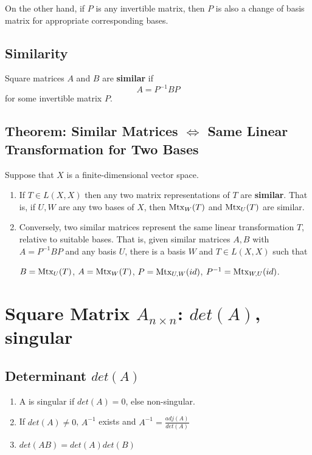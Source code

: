 \documentclass[11pt]{elegantbook}
\begin{document}
On the other hand, if $P$ is any invertible matrix, then $P$ is also a change of basis matrix for appropriate corresponding bases.

\subsection{Similarity}
\begin{definition}[Similar]
    \normalfont
    Square matrices $A$ and $B$ are \textbf{similar} if $$A=P^{-1}BP$$ for some invertible matrix $P$.
\end{definition}


\subsection{Theorem: Similar Matrices $\Leftrightarrow$ Same Linear Transformation for Two Bases}
\begin{theorem}
    Suppose that $X$ is a finite-dimensional vector space.
    \begin{enumerate}
        \item If $T \in L(X, X)$ then any two matrix representations of $T$ are \textbf{similar}. That is, if $U, W$ are any two bases of $X$, then $\textnormal{Mtx}_W(T)$ and $\textnormal{Mtx}_U(T)$ are similar.
        \item Conversely, two similar matrices represent the same linear transformation $T$, relative to suitable bases. That is, given similar matrices $A, B$ with $A = P^{-1}BP$ and any basis $U$, there is a basis $W$ and $T \in L(X, X)$ such that
        \begin{center}
            $B=\textnormal{Mtx}_U(T)$, $A=\textnormal{Mtx}_W(T)$, $P=\textnormal{Mtx}_{U,W}(id)$, $P^{-1}=\textnormal{Mtx}_{W,U}(id)$.
        \end{center}
    \end{enumerate}
\end{theorem}





\section{Square Matrix $A_{n\times n}$: $det(A)$, singular}
\subsection{Determinant $det(A)$}
\begin{enumerate}
    \item A is singular if $det(A)=0$, else non-singular.
    \item If $det(A)\neq 0$, $A^{-1}$ exists and $A^{-1}=\frac{adj(A)}{det(A)}$
    \item $det(AB)=det(A)det(B)$
\end{enumerate}
\end{document}
